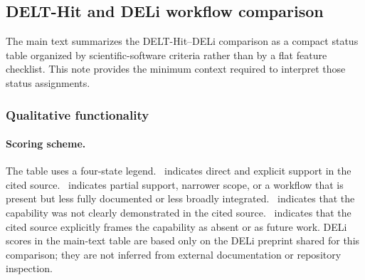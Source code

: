 \subsection{DELT-Hit and DELi workflow comparison}
\label{supp:comparison-delt-deli}

\providecommand{\statusgreen}{\raisebox{0.15ex}{\textcolor{green!50!black}{\LARGE$\bullet$}}}
\providecommand{\statusamber}{\raisebox{0.15ex}{\textcolor{orange!90!black}{\LARGE$\bullet$}}}
\providecommand{\statusopen}{\raisebox{0.15ex}{\textcolor{black!45}{\LARGE$\bullet$}}}
\providecommand{\statusred}{\raisebox{0.15ex}{\textcolor{blue!70!black}{\LARGE$\bullet$}}}

The main text summarizes the DELT-Hit--DELi\cite{wellnitz_opensourcednaencodedlibrary_2025} comparison as a compact status table organized by scientific-software criteria rather than by a flat feature checklist. This note provides the minimum context required to interpret those status assignments.

\subsubsection{Qualitative functionality}

\paragraph{Scoring scheme.}
The table uses a four-state legend. \statusgreen\ indicates direct and explicit support in the cited source. \statusamber\ indicates partial support, narrower scope, or a workflow that is present but less fully documented or less broadly integrated. \statusopen\ indicates that the capability was not clearly demonstrated in the cited source. \statusred\ indicates that the cited source explicitly frames the capability as absent or as future work. DELi scores in the main-text table are based only on the DELi preprint shared for this comparison; they are not inferred from external documentation or repository inspection.

